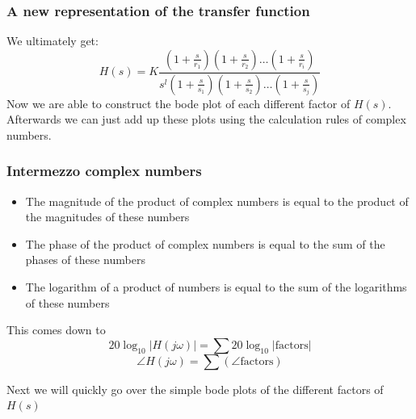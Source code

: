 \begin{frame}
\frametitle{A new representation of the transfer function}

We ultimately get: $$H(s) = K \frac{(1+\frac{s}{r_1}) (1+\frac{s}{r_2}) \ldots (1+\frac{s}{r_i})}{s^l (1+\frac{s}{s_1}) (1+\frac{s}{s_2}) \ldots (1 + \frac{s}{s_j})}$$
Now we are able to construct the bode plot of each different factor of $H(s)$. Afterwards we can just add up these plots using the calculation rules of complex numbers.

  
\end{frame}



\begin{frame}
\frametitle{Intermezzo complex numbers}
\begin{itemize}
\item The magnitude of the product of complex numbers is equal to the product of the magnitudes of these numbers
\item The phase of the product of complex numbers is equal to the sum of the phases of these numbers
\item The logarithm of a product of numbers is equal to the sum of the logarithms of these numbers

\end{itemize}
This comes down to 
$$ 20\log_{10}|H(j\omega)| = \sum 20\log_{10}|\text{factors}| $$ 
$$ \angle H(j\omega) = \sum(\angle \text{factors})$$

Next we will quickly go over the simple bode plots of the different factors of $H(s)$

\end{frame}




